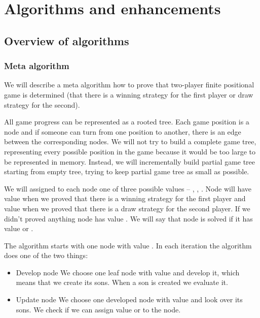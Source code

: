 \chapter{Algorithms and enhancements}

\section{Overview of algorithms}

\subsection{Meta algorithm}

We will describe a meta algorithm how to prove that two-player finite
positional game is determined (that there is a winning strategy for the first
player or draw strategy for the second).

All game progress can be represented as a rooted tree. Each game position is a
node and if someone can turn from one position to another, there is an edge
between the corresponding nodes. We will not try to build a complete game tree,
representing every possible position in the game because it would be too large
to be represented in memory. Instead, we will incrementally  build partial game 
tree starting from empty tree, trying to keep partial game tree as small as
possible.

We will assigned to each node one of three possible values -- \value{true},
\value{false}, \value{unknown}. Node will have value \value{true} when we
proved that there is a winning strategy for the first player and value
\value{false} when we proved that there is a draw strategy for the second
player. If we didn't proved anything node has value \value{unknown}. We will
say that node is solved if it has value \value{true} or \value{false}.

The algorithm starts with one node with value \value{unknown}. In each iteration the
algorithm does one of the two things:

\begin{itemize} 
	\item{Develop node} We choose one leaf node with value \value{unknown}
		and develop it, which means that we create its sons. When 
		a son is created we evaluate it.
	\item{Update node} We choose one developed node with value \value{unknown}
		and look over its sons. We check if we can assign value \value{true} 
		or \value{false} to the node.
\end{itemize}

